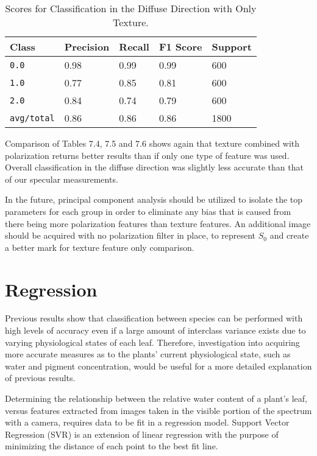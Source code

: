 %
\begin{table}
  \centering
  \begin{tabular}{lllll}
    \toprule
    \textbf{Class} & \textbf{Precision} & \textbf{Recall} & \textbf{F1 Score} & Support\\
    \midrule
      \texttt{0.0} & 0.98 & 0.99 & 0.99 & 600 \\
      \texttt{1.0} & 0.77 & 0.85 & 0.81 & 600 \\
      \texttt{2.0} & 0.84 & 0.74 & 0.79 & 600 \\
      \texttt{avg/total} & 0.86 & 0.86 & 0.86 & 1800 \\
    \bottomrule
  \end{tabular}
  \caption{%
    Scores for Classification in the Diffuse Direction with Only Texture.
  }
  \label{tab:Packages}
\end{table}
%
Comparison of Tables 7.4, 7.5 and 7.6 shows again that texture combined with polarization returns better results than if only one type of feature was used.  Overall classification in the diffuse direction was slightly less accurate than that of our specular measurements.

In the future, principal component analysis should be utilized to isolate the top parameters for each group in order to eliminate any bias that is caused from there being more polarization features than texture features. An additional image should be acquired with no polarization filter in place, to represent $S_0$ and create a better mark for texture feature only comparison.

\section{Regression}
Previous results show that classification between species can be performed with high levels of accuracy even if a large amount of interclass variance exists due to varying physiological states of each leaf.  Therefore, investigation into acquiring more accurate measures as to the plants' current physiological state, such as water and pigment concentration, would be useful for a more detailed explanation of previous results.

Determining the relationship between the relative water content of a plant's leaf, versus features extracted from images taken in the visible portion of the spectrum with a camera, requires data to be fit in a regression model.  Support Vector Regression (SVR) is an extension of linear regression with the purpose of minimizing the distance of each point to the best fit line.

